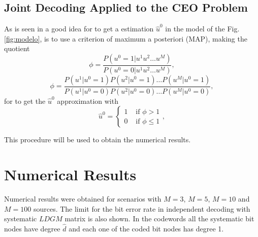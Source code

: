 \documentclass[journal]{IEEEtran}
\begin{document}
\subsection{Joint Decoding Applied to the CEO Problem} 
\label{subsec:ceoproblem}
As is seen in \cite{optimalceo} a good idea for to get a estimation $\hat{u}^0$ 
in the model of the Fig. \ref{fig:modelo},
is to use a criterion of maximum a posteriori (MAP), making the quotient
\begin{equation}\label{eq:ceo_0}
\phi=\frac{P(u^0=1|u^1 u^2 \dots u^{M})}{P(u^0=0|u^1 u^2 \dots u^{M})},
\end{equation}
\begin{equation}\label{eq:ceo_2}
\phi=\frac{P(u^1|u^0=1) P(u^2|u^0=1)  \dots P(u^{M}|u^0=1)}{P(u^1|u^0=0) P(u^2|u^0=0)  \dots P(u^{M}|u^0=0)},
\end{equation}
for to get the $\hat{u}^0$ approximation with
\begin{equation}\label{eq:ceo_1}
\hat{u}^0=
\begin{cases}
1 & \text{ if } \phi > 1 \\ 
0 & \text{ if } \phi \leq 1
\end{cases} ,
\end{equation}

This procedure will be used to obtain the numerical results.
\section{Numerical Results} \label{sec:NumRes}

Numerical results were obtained for scenarios with $M=3$, $M=5$, $M=10$ and $M=100$ sources.
The limit for the bit error rate \cite{art-garciafrias} in independent  decoding  with systematic $LDGM$ matrix is also shown.
In the codewords all the systematic bit nodes have degree $\hat{d}$ and each one of the coded bit nodes has degree 1.
\end{document}
